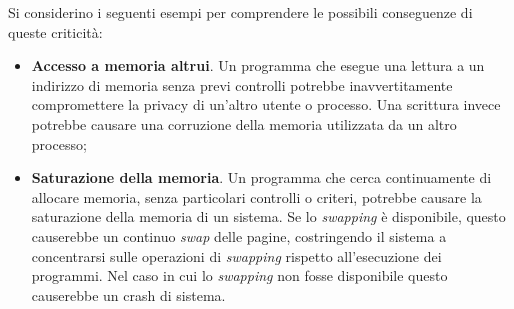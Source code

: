 Si considerino i seguenti esempi per comprendere le possibili conseguenze di queste criticità:
\begin{itemize}
    \item \textbf{Accesso a memoria altrui}. Un programma che esegue una lettura a un indirizzo di memoria senza previ controlli potrebbe inavvertitamente compromettere la privacy di un'altro utente o processo. Una scrittura invece potrebbe causare una corruzione della memoria utilizzata da un altro processo;
    \item \textbf{Saturazione della memoria}. Un programma che cerca continuamente di allocare memoria, senza particolari controlli o criteri, potrebbe causare la saturazione della memoria di un sistema. Se lo \textit{swapping} è disponibile, questo causerebbe un continuo \textit{swap} delle pagine, costringendo il sistema a concentrarsi sulle operazioni di \textit{swapping} rispetto all'esecuzione dei programmi. Nel caso in cui lo \textit{swapping} non fosse disponibile questo causerebbe un crash di sistema.
\end{itemize}